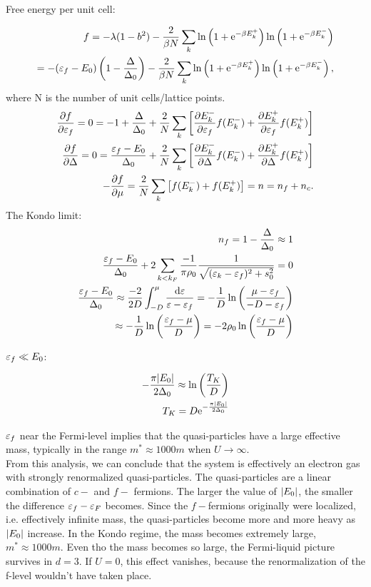 Free energy per unit cell: 

\begin{align*}
    f = -\lambda(1-b^2) - \frac{2}{\beta N} \sum_k \ln\left(1 + \mathrm{e}^{-\beta E_k^+} \right) \ln\left(1 + \mathrm{e}^{-\beta E_k^-} \right) \\ 
    = -(\varepsilon_f - E_0)\left( 1 - \frac{\Delta}{\Delta_0} \right) - \frac{2}{\beta N} \sum_k \ln\left(1 + \mathrm{e}^{-\beta E_k^+} \right) \ln\left(1 + \mathrm{e}^{-\beta E_k^-} \right), 
 \end{align*}
where N is the number of unit cells/lattice points. 
\begin{align*}
    \pdv{f}{\varepsilon_f} = 0 = -1 + \frac{\Delta}{\Delta_0} + \frac{2}{N}\sum_k \left[ \pdv{E_k^-}{\varepsilon_f}f(E_k^-) + \pdv{E_k^+}{\varepsilon_f}f(E_k^+)\right] \\ 
    \pdv{f}{\Delta} = 0 = \frac{\varepsilon_f - E_0}{\Delta_0} + \frac{2}{N} \sum_k \left[ \pdv{E_k^-}{\Delta}f(E_k^-) + \pdv{E_k^+}{\Delta}f(E_k^+)\right] \\ 
    -\pdv{f}{\mu} = \frac{2}{N}\sum_k \left[ f(E_k^-) + f(E_k^+) \right] = n = n_f + n_c. 
\end{align*}
The Kondo limit: 
\begin{align*}
    n_f = 1 - \frac{\Delta}{\Delta_0} \approx 1 \\ 
    \frac{\varepsilon_f - E_0}{\Delta_0} + 2\sum_{k<k_F}\frac{-1}{\pi \rho_0} \frac{1}{\sqrt{(\varepsilon_k - \varepsilon_f)^2 + s_0^2}} = 0 \\
    \frac{\varepsilon_f - E_0}{\Delta_0} \approx \frac{-2}{2D}\int_{-D}^{\mu} \frac{\dd \varepsilon}{\varepsilon - \varepsilon_f} = -\frac{1}{D}\ln\left(\frac{\mu - \varepsilon_f }{-D - \varepsilon_f}\right) \\ 
    \approx -\frac{1}{D}\ln\left(\frac{\varepsilon_f - \mu}{D}\right) = -2\rho_0 \ln\left(\frac{\varepsilon_f - \mu}{D}\right)
\end{align*}

$\varepsilon_f \ll E_0$: 

\begin{align*}
    -\frac{\pi \abs{E_0}}{2\Delta_0} \approx \ln \left( \frac{T_K}{D}\right) \\
    T_K = D\mathrm{e}^{-\frac{\pi \abs{E_0}}{2\Delta_0}}
\end{align*}

$\varepsilon_f$ near the Fermi-level implies that the quasi-particles have a large effective mass, typically in the range $m^* \approx 1000m$ when $U \to \infty$. \\ 

From this analysis, we can conclude that the system is effectively an electron gas with strongly renormalized quasi-particles. The quasi-particles are a linear combination of $c-$ and $f-$ fermions. The larger the value of $\abs{E_0}$, the smaller the difference $\varepsilon_f - \varepsilon_F$ becomes. Since the $f-$fermions originally were localized, i.e. effectively infinite mass, the quasi-particles become more and more heavy as $\abs{E_0}$ increase. In the Kondo regime, the mass becomes extremely large, $m^* \approx 1000m$. Even tho the mass becomes so large, the Fermi-liquid picture survives in $d = 3$. If $U = 0$, this effect vanishes, because the renormalization of the f-level wouldn't have taken place. \\

